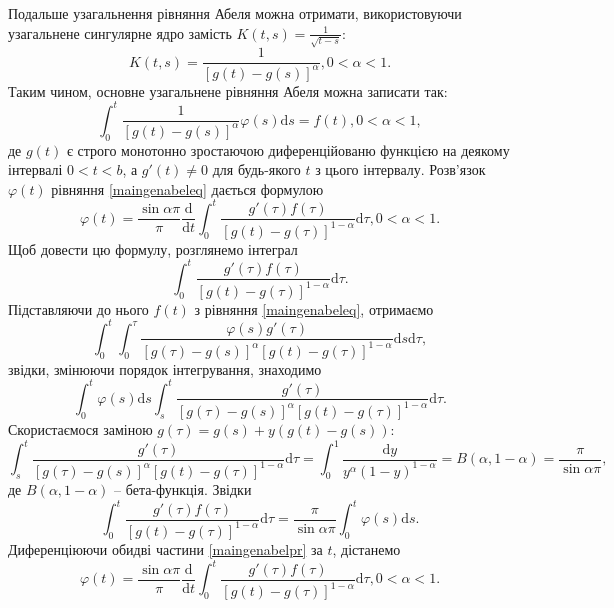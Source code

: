 \documentclass[14pt,twoside]{extreport}
\theoremstyle{mystyle}
\numberwithin{equation}{chapter}
\begin{document}
Подальше узагальнення рівняння Абеля можна отримати, використовуючи узагальнене сингулярне ядро замість $K(t, s)=\frac{1}{\sqrt{t-s}}$:
\begin{equation*}
	K(t, s)=\frac{1}{[g(t)-g(s)]^{\alpha}}, 0<\alpha<1.
\end{equation*}
Таким чином, основне узагальнене рівняння Абеля можна записати так:
\begin{equation}\label{maingenabeleq}
	\displaystyle \int_{0}^{t}\frac{1}{[g(t)-g(s)]^{\alpha}}\varphi(s)\mathrm{d}s = f(t), 0<\alpha<1,
\end{equation}
де $g(t)$ є строго монотонно зростаючою диференційованю функцією на деякому інтервалі $0<t<b$, а $g'(t)\neq 0$ для будь-якого $t$ з цього інтервалу. Розв'язок $\varphi(t)$ рівняння \eqref{maingenabeleq} дається формулою
\begin{equation}\label{maingenabelsol}
	\varphi(t)=\displaystyle \frac{\sin\alpha\pi}{\pi}\frac{\mathrm{d}}{\mathrm{d}t}\int_{0}^{t}\frac{g'(\tau)f(\tau)}{[g(t)-g(\tau)]^{1-\alpha}}\mathrm{d}\tau, 0<\alpha<1.
\end{equation}
Щоб довести цю формулу, розглянемо інтеграл
$$
\int_{0}^{t}\frac{g'(\tau)f(\tau)}{[g(t)-g(\tau)]^{1-\alpha}}\mathrm{d}\tau.
$$
Підставляючи до нього $f(t)$ з рівняння \eqref{maingenabeleq}, отримаємо
$$
\int_{0}^{t}\int_{0}^{\tau}\frac{\varphi(s)g'(\tau)}{[g(\tau)-g(s)]^{\alpha}[g(t)-g(\tau)]^{1-\alpha}}\mathrm{d}s\mathrm{d}\tau,
$$
звідки, змінюючи порядок інтегрування, знаходимо
$$
\int_{0}^{t}\varphi(s)\mathrm{d}s\int_{s}^{t}\frac{g'(\tau)}{[g(\tau)-g(s)]^{\alpha}[g(t)-g(\tau)]^{1-\alpha}}\mathrm{d}\tau.
$$
Скористаємося заміною $g(\tau) = g(s) + y(g(t)-g(s))$:
\begin{equation}
	\displaystyle \int_{s}^{t}\frac{g'(\tau)}{[g(\tau)-g(s)]^{\alpha}[g(t)-g(\tau)]^{1-\alpha}}\mathrm{d}\tau= \int_0^1 \frac{\mathrm{d}y}{y^\alpha(1-y)^{1-\alpha}} = B(\alpha, 1-\alpha)=\frac{\pi}{\sin\alpha\pi},
\end{equation}
де $B(\alpha, 1-\alpha)$ -- бета-функція. Звідки
\begin{equation}\label{maingenabelpr}
	\displaystyle \int_{0}^{t}\frac{g'(\tau)f(\tau)}{[g(t)-g(\tau)]^{1-\alpha}}\mathrm{d}\tau=\frac{\pi}{\sin\alpha\pi}\int_{0}^{t}\varphi(s)\mathrm{d}s.
\end{equation}
Диференціюючи обидві частини \eqref{maingenabelpr} за $t$, дістанемо
\begin{equation}
	\varphi(t)=\displaystyle \frac{\sin\alpha\pi}{\pi}\frac{\mathrm{d}}{\mathrm{d}t}\int_{0}^{t}\frac{g'(\tau)f(\tau)}{[g(t)-g(\tau)]^{1-\alpha}}\mathrm{d}\tau, 0<\alpha<1.
\end{equation}
\end{document}
